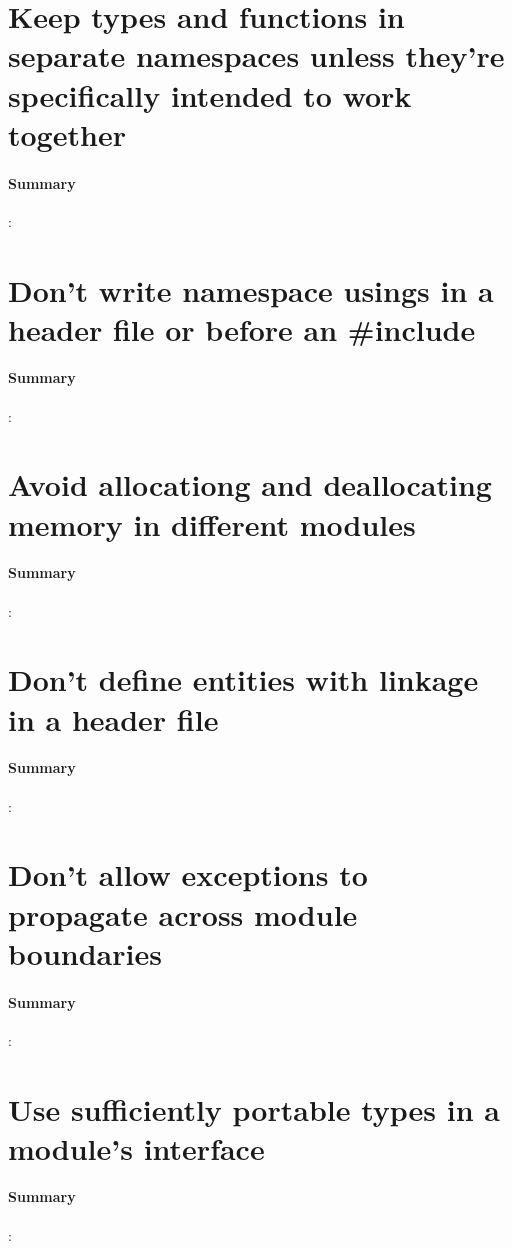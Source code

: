 \documentclass[UTF8,a4paper,12pt]{ctexbook}
\begin{document}
		
	\section{Keep types and functions in separate namespaces unless they're specifically intended to work together}
		\paragraph{Summary}:
		
		
	\section{Don't write namespace usings in a header file or before an \#include}
		\paragraph{Summary}:
		
		
	\section{Avoid allocationg and deallocating memory in different modules}
		\paragraph{Summary}:
		
		
	\section{Don't define entities with linkage in a header file}
		\paragraph{Summary}:
		
		
	\section{Don't allow exceptions to propagate across module boundaries}
		\paragraph{Summary}:
		
		
	\section{Use sufficiently portable types in a module's interface}
		\paragraph{Summary}:
		
\end{document}
